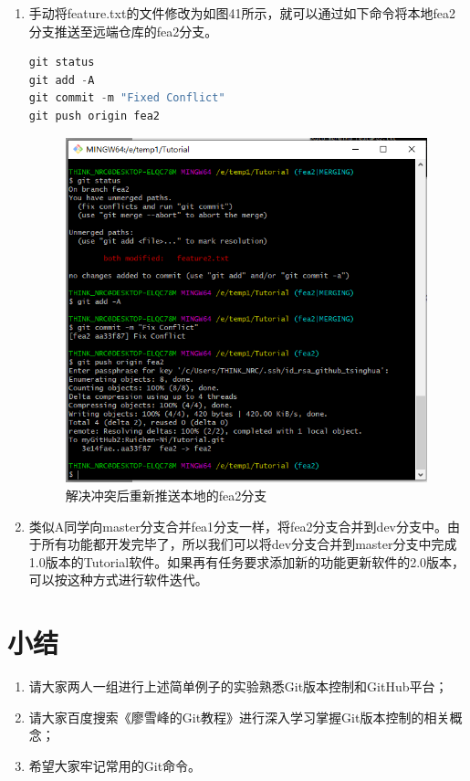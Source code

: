 \documentclass[a4paper,14pt]{article}
\begin{document}
\begin{enumerate}[1. ]
\newpage
\item 手动将feature.txt的文件修改为如图41所示，就可以通过如下命令将本地fea2分支推送至远端仓库的fea2分支。
{\color{red}
\begin{lstlisting}[language=C]
git status
git add -A
git commit -m "Fixed Conflict"
git push origin fea2
\end{lstlisting}
}
\begin{figure}[h]
\centering
\includegraphics[height=10cm]{figure/stepB14}
\caption{解决冲突后重新推送本地的fea2分支}
\end{figure}

\item 类似A同学向master分支合并fea1分支一样，将fea2分支合并到dev分支中。由于所有功能都开发完毕了，所以我们可以将dev分支合并到master分支中完成1.0版本的Tutorial软件。如果再有任务要求添加新的功能更新软件的2.0版本，可以按这种方式进行软件迭代。
\end{enumerate}

\section{小结}
\begin{enumerate}[1. ]
\item 请大家两人一组进行上述简单例子的实验熟悉Git版本控制和GitHub平台；
\item 请大家百度搜索《廖雪峰的Git教程》进行深入学习掌握Git版本控制的相关概念；
\item 希望大家牢记常用的Git命令。
\end{enumerate}
\end{document}

